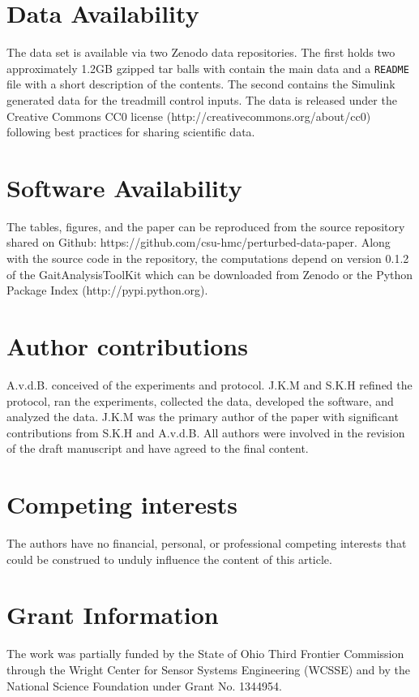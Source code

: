 \documentclass[fleqn,12pt]{wlpeerj}
\begin{document}
\section*{Data Availability}
%
The data set \citep{Moore2014} is available via two Zenodo data repositories.
The first holds two approximately 1.2GB gzipped tar balls with contain the main
data and a \verb|README| file with a short description of the contents. The
second \citep{Hnat2015} contains the Simulink generated data for the treadmill
control inputs. The data is released under the Creative Commons CC0 license
(http://creativecommons.org/about/cc0) following best practices for sharing
scientific data.

\section*{Software Availability}
%
The tables, figures, and the paper can be reproduced from the source
repository shared on Github: https://github.com/csu-hmc/perturbed-data-paper.
Along with the source code in the repository, the computations depend on
version 0.1.2 of the GaitAnalysisToolKit \citep{Moore2014a} which can be
downloaded from Zenodo or the Python Package Index (http://pypi.python.org).

\section*{Author contributions}
A.v.d.B. conceived of the experiments and protocol. J.K.M and S.K.H refined the
protocol, ran the experiments, collected the data, developed the software, and
analyzed the data. J.K.M was the primary author of the paper with significant
contributions from S.K.H and A.v.d.B. All authors were involved in the revision
of the draft manuscript and have agreed to the final content.

\section*{Competing interests}
The authors have no financial, personal, or professional competing interests
that could be construed to unduly influence the content of this article.

\section*{Grant Information}
The work was partially funded by the State of Ohio Third Frontier Commission
through the Wright Center for Sensor Systems Engineering (WCSSE) and by the
National Science Foundation under Grant No. 1344954.
\end{document}
